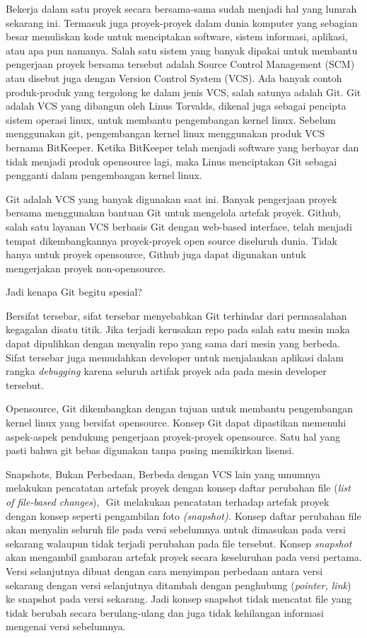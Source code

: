 Bekerja dalam satu proyek secara bersama-sama sudah menjadi hal yang lumrah sekarang ini. Termasuk juga proyek-proyek dalam dunia komputer yang sebagian besar menuliskan kode untuk menciptakan software, sistem informasi, aplikasi, atau apa pun namanya. Salah satu sistem yang banyak dipakai untuk membantu pengerjaan proyek bersama tersebut adalah Source Control Management (SCM) atau disebut juga dengan Version Control System (VCS). Ada banyak contoh produk-produk yang tergolong ke dalam jenis VCS, salah satunya adalah Git. Git adalah VCS yang dibangun oleh Linus Torvalds, dikenal juga sebagai pencipta sistem operasi linux, untuk membantu pengembangan kernel linux. Sebelum menggunakan git, pengembangan kernel linux menggunakan produk VCS bernama BitKeeper. Ketika BitKeeper telah menjadi software yang berbayar dan tidak menjadi produk opensource lagi, maka Linus menciptakan Git sebagai pengganti dalam pengembangan kernel linux. \par
Git adalah VCS yang banyak digunakan saat ini. Banyak pengerjaan proyek bersama menggunakan bantuan Git untuk mengelola artefak proyek. Github, salah satu layanan VCS berbasis Git dengan web-based interface, telah menjadi tempat dikembangkannya proyek-proyek open source diseluruh dunia. Tidak hanya untuk proyek opensource, Github juga dapat digunakan untuk mengerjakan proyek non-opensource. \par
\noindent 
Jadi kenapa Git begitu spesial? \par
\noindent 
Bersifat tersebar, sifat tersebar menyebabkan Git terhindar dari permasalahan kegagalan disatu titik. Jika terjadi kerusakan repo pada salah satu mesin maka dapat dipulihkan dengan menyalin repo yang sama dari mesin yang berbeda. Sifat tersebar juga memudahkan developer untuk menjalankan aplikasi dalam rangka \textit{debugging $  $}karena seluruh artifak proyek ada pada mesin developer tersebut. \par
\noindent 
Opensource, Git dikembangkan dengan tujuan untuk membantu pengembangan kernel linux yang bersifat opensource. Konsep Git dapat dipastikan memenuhi aspek-aspek pendukung pengerjaan proyek-proyek opensource. Satu hal yang pasti bahwa git bebas digunakan tanpa pusing memikirkan lisensi. \par
\noindent 
Snapshots, Bukan Perbedaan, Berbeda $  $dengan VCS lain yang umumnya melakukan pencatatan artefak proyek dengan konsep daftar perubahan file (\textit{list of file-based changes}), $  $ $  $Git melakukan pencatatan terhadap artefak proyek dengan konsep seperti pengambilan foto \textit{(snapshot). $  $}Konsep daftar perubahan file akan menyalin seluruh file pada versi sebelumnya untuk dimasukan pada versi sekarang walaupun tidak terjadi perubahan pada file tersebut. Konsep \textit{snapshot $  $}akan mengambil gambaran artefak proyek secara keseluruhan pada versi pertama. Versi selanjutnya dibuat dengan cara menyimpan perbedaan antara versi sekarang dengan versi selanjutnya ditambah dengan penghubung (\textit{pointer, link}) ke snapshot pada versi sekarang. Jadi konsep snapshot tidak mencatat file yang tidak berubah secara berulang-ulang dan juga tidak kehilangan informasi mengenai versi sebelumnya. \par
